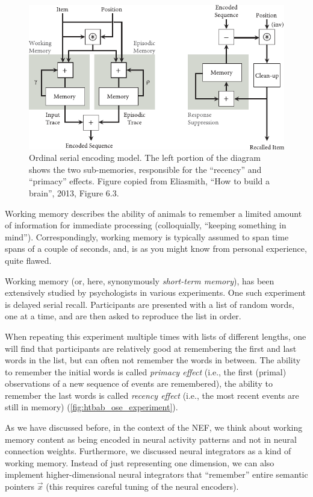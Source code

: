 \documentclass[10pt,letterpaper,oneside]{article}
\begin{document}
\begin{figure}[t]
	\centering
	\includegraphics[scale=1.2]{media/htbab_ose.pdf}
	\caption{Ordinal serial encoding model. The left portion of the diagram shows the two sub-memories, responsible for the \enquote{recency} and \enquote{primacy} effects. Figure copied from Eliasmith, \enquote{How to build a brain}, 2013, Figure 6.3.}
	\label{fig:htbab_ose}
\end{figure}

Working memory describes the ability of animals to remember a limited amount of information for immediate processing (colloquially, \enquote{keeping something in mind}). Correspondingly, working memory is typically assumed to span time spans of a couple of seconds, and, is as you might know from personal experience, quite flawed.

Working memory (or, here, synonymously \emph{short-term memory}), has been extensively studied by psychologists in various experiments. One such experiment is delayed serial recall. Participants are presented with a list of random words, one at a time, and are then asked to reproduce the list in order.

When repeating this experiment multiple times with lists of different lengths, one will find that participants are relatively good at remembering the first and last words in the list, but can often not remember the words in between. The ability to remember the initial words is called \emph{primacy effect} (i.e., the first (primal) observations of a new sequence of events are remembered), the ability to remember the last words is called \emph{recency effect} (i.e., the most recent events are still in memory) (\cref{fig:htbab_ose_experiment}).

As we have discussed before, in the context of the NEF, we think about working memory content as being encoded in neural activity patterns and not in neural connection weights. Furthermore, we discussed neural integrators as a kind of working memory. Instead of just representing one dimension, we can also implement higher-dimensional neural integrators that \enquote{remember} entire semantic pointers $\vec x$ (this requires careful tuning of the neural encoders).
\end{document}
